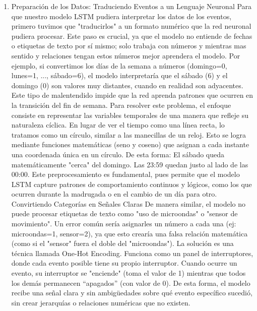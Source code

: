 \begin{enumerate}
            \begin{enumerate}
                  \item Preparación de los Datos: Traduciendo Eventos a un Lenguaje Neuronal
                        Para que nuestro modelo LSTM pudiera interpretar los datos de los eventos, primero tuvimos que "traducirlos" a un formato numérico que la red neuronal pudiera procesar. Este paso es crucial, ya que el modelo no entiende de fechas o etiquetas de texto por sí mismo; solo trabaja con números y mientras mas sentido y relaciones tengan estos números mejor aprendera el modelo.
                        Por ejemplo, si convertimos los días de la semana a números (domingo=0, lunes=1, ..., sábado=6), el modelo interpretaría que el sábado (6) y el domingo (0) son valores muy distantes, cuando en realidad son adyacentes. Este tipo de malentendido impide que la red aprenda patrones que ocurren en la transición del fin de semana.
                        Para resolver este problema, el enfoque consiste en representar las variables temporales de una manera que refleje su naturaleza cíclica. En lugar de ver el tiempo como una línea recta, lo tratamos como un círculo, similar a las manecillas de un reloj. Esto se logra mediante funciones matemáticas (seno y coseno) que asignan a cada instante una coordenada única en un círculo. De esta forma:
                        El sábado queda matemáticamente "cerca" del domingo.
                        Las 23:59 quedan justo al lado de las 00:00.
                        Este preprocesamiento es fundamental, pues permite que el modelo LSTM capture patrones de comportamiento continuos y lógicos, como los que ocurren durante la madrugada o en el cambio de un día para otro.
                        Convirtiendo Categorías en Señales Claras
                        De manera similar, el modelo no puede procesar etiquetas de texto como "uso de microondas" o "sensor de movimiento". Un error común sería asignarles un número a cada una (ej: microondas=1, sensor=2), ya que esto crearía una falsa relación matemática (como si el "sensor" fuera el doble del "microondas").
                        La solución es una técnica llamada One-Hot Encoding. Funciona como un panel de interruptores, donde cada evento posible tiene su propio interruptor.
                        Cuando ocurre un evento, su interruptor se "enciende" (toma el valor de 1) mientras que todos los demás permanecen ``apagados'' (con valor de 0). De esta forma, el modelo recibe una señal clara y sin ambigüedades sobre qué evento específico sucedió, sin crear jerarquías o relaciones numéricas que no existen.

\end{enumerate}
\end{enumerate}
